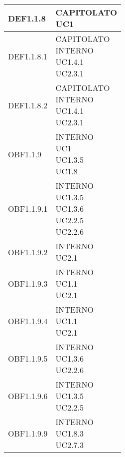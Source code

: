 \documentclass{scalatekids-article}
\begin{document}
\begin{longtable}[H]{|p{5.5cm}|p{5.5cm}|}
  \hline
  DEF1.1.8 & \multiLineCell[t]{CAPITOLATO\\UC1\\}\\
  \hline
  DEF1.1.8.1 & \multiLineCell[t]{CAPITOLATO\\INTERNO\\UC1.4.1\\UC2.3.1\\}\\
  \hline
  DEF1.1.8.2 & \multiLineCell[t]{CAPITOLATO\\INTERNO\\UC1.4.1\\UC2.3.1\\}\\
  \hline
  OBF1.1.9 & \multiLineCell[t]{INTERNO\\UC1\\UC1.3.5\\UC1.8\\}\\
  \hline
  OBF1.1.9.1 & \multiLineCell[t]{INTERNO\\UC1.3.5\\UC1.3.6\\UC2.2.5\\UC2.2.6\\}\\
  \hline
  OBF1.1.9.2 & \multiLineCell[t]{INTERNO\\UC2.1\\}\\
  \hline
  OBF1.1.9.3 & \multiLineCell[t]{INTERNO\\UC1.1\\UC2.1\\}\\
  \hline
  OBF1.1.9.4 & \multiLineCell[t]{INTERNO\\UC1.1\\UC2.1\\}\\
  \hline
  OBF1.1.9.5 & \multiLineCell[t]{INTERNO\\UC1.3.6\\UC2.2.6\\}\\
  \hline
  OBF1.1.9.6 & \multiLineCell[t]{INTERNO\\UC1.3.5\\UC2.2.5\\}\\
  \hline
  OBF1.1.9.9 & \multiLineCell[t]{INTERNO\\UC1.8.3\\UC2.7.3\\}\\

\end{longtable}
\end{document}
